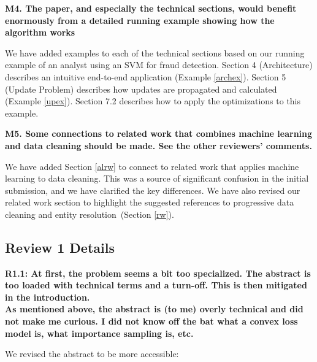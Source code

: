 \vspace{0.5em}

\noindent\textbf{M4. The paper, and especially the technical sections, would benefit enormously from a detailed running example showing how the algorithm works}

We have added examples to each of the technical sections based on our running example of an analyst using an SVM for fraud detection. 
Section 4 (Architecture) describes an intuitive end-to-end application (Example \ref{archex}).
Section 5 (Update Problem) describes how updates are propagated and calculated (Example \ref{upex}).
Section 7.2 describes how to apply the optimizations to this example.

\vspace{0.5em}

\noindent\textbf{M5. Some connections to related work that combines machine learning and data cleaning should be made. See the other reviewers' comments.}

We have added Section \ref{alrw} to connect \sys to related work that applies machine learning to data cleaning.
This was a source of significant confusion in the initial submission, and we have clarified the key differences.
We have also revised our related work section to highlight the suggested references to progressive data cleaning and entity resolution~(Section \ref{rw}).

\subsection*{Review 1 Details} 

\noindent\textbf{R1.1: At first, the problem seems a bit too specialized. The abstract is too loaded with technical terms and a turn-off. This is then mitigated in the introduction. \\
As mentioned above, the abstract is (to me) overly technical and did not make me curious. I did not know off the bat what a convex loss model is, what importance sampling is, etc.}

\noindent We revised the abstract to be more accessible:

